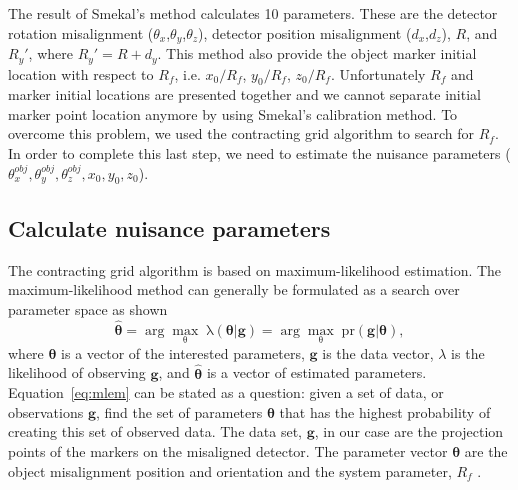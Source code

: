 The result of Smekal's method calculates 10 parameters.  These are the detector rotation misalignment ($\theta_x$,$\theta_y$,$\theta_z$), detector position misalignment ($d_x$,$d_z$), $R$, and $R_y'$, where $R_y' = R + d_y$.  This method also provide the object marker initial location with respect to $R_f$, i.e. $x_0/R_f$, $y_0/R_f$, $z_0/R_f$.  Unfortunately $R_f$ and marker initial locations are presented together and we cannot separate initial marker point location anymore by using Smekal's calibration method.  To overcome this problem, we used the contracting grid algorithm to search for $R_f$.  In order to complete this last step, we need to estimate the nuisance parameters ($\theta_x^{obj}, \theta_y^{obj}, \theta_z^{obj}, x_0, y_0, z_0$).


\subsection{Calculate nuisance parameters}
The contracting grid algorithm is based on maximum-likelihood estimation.  The maximum-likelihood method can generally be formulated as a search over parameter space as shown 
\begin{equation}
\label{eq:mlem}
\mathrm{\hat{\boldsymbol{\theta}} = \arg\max_{\theta} \; \lambda (\boldsymbol{\theta}| \boldsymbol{g}) = \arg\max_{\theta} \; pr( \boldsymbol{g}|\boldsymbol{\theta} )},
\end{equation}
where $\boldsymbol{\theta}$ is a vector of the interested parameters, $\boldsymbol{g}$ is the data vector, $\lambda$ is the likelihood of observing $\boldsymbol{g}$, and $\hat{\boldsymbol{\theta}}$ is a vector of estimated parameters. 
Equation~\ref{eq:mlem} can be stated as a question: given a set of data, or observations $\boldsymbol{g}$, find the set of parameters $\boldsymbol{\theta}$ that has the highest probability of creating this set of observed data.  The data set, $\boldsymbol{g}$, in our case are the projection points of the markers on the misaligned detector. The parameter vector $\boldsymbol{\theta}$ are the object misalignment position and orientation and the system parameter, $R_f$ .  

